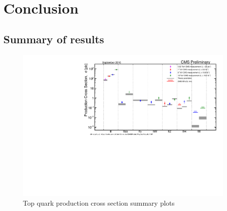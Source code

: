 \chapter{Conclusion}
\label{c:DandC}

\section{Summary of results}

\begin{figure}[ht!]
\begin{center}
    \includegraphics[width=0.97\textwidth]{images/Conclusion/ttplusx_staircase.pdf}
    \caption{Top quark production cross section summary plots}
    \label{fig:ttbarXstairway}
\end{center}
\end{figure}

